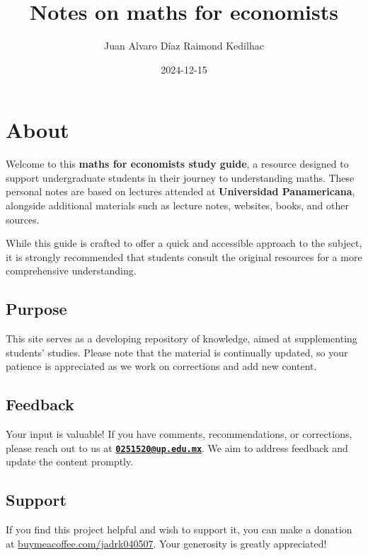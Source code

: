 \documentclass[
]{book}
\title{Notes on maths for economists}
\author{Juan Alvaro Díaz Raimond Kedilhac}
\date{2024-12-15}
\theoremstyle{definition}
\theoremstyle{definition}
\theoremstyle{definition}
\theoremstyle{definition}
\theoremstyle{remark}
\begin{document}
\maketitle

{
\setcounter{tocdepth}{1}
\tableofcontents
}
\hypertarget{about}{%
\chapter{About}\label{about}}

Welcome to this \textbf{maths for economists study guide}, a resource designed to support undergraduate students in their journey to understanding maths. These personal notes are based on lectures attended at \textbf{Universidad Panamericana}, alongside additional materials such as lecture notes, websites, books, and other sources.

While this guide is crafted to offer a quick and accessible approach to the subject, it is strongly recommended that students consult the original resources for a more comprehensive understanding.

\hypertarget{purpose}{%
\section{Purpose}\label{purpose}}

This site serves as a developing repository of knowledge, aimed at supplementing students' studies. Please note that the material is continually updated, so your patience is appreciated as we work on corrections and add new content.

\hypertarget{feedback}{%
\section{Feedback}\label{feedback}}

Your input is valuable! If you have comments, recommendations, or corrections, please reach out to us at \textbf{\href{mailto:0251520@up.edu.mx}{\nolinkurl{0251520@up.edu.mx}}}. We aim to address feedback and update the content promptly.

\hypertarget{support}{%
\section{Support}\label{support}}

If you find this project helpful and wish to support it, you can make a donation at \href{https://buymeacoffee.com/jadrk040507}{buymeacoffee.com/jadrk040507}. Your generosity is greatly appreciated!
\end{document}
